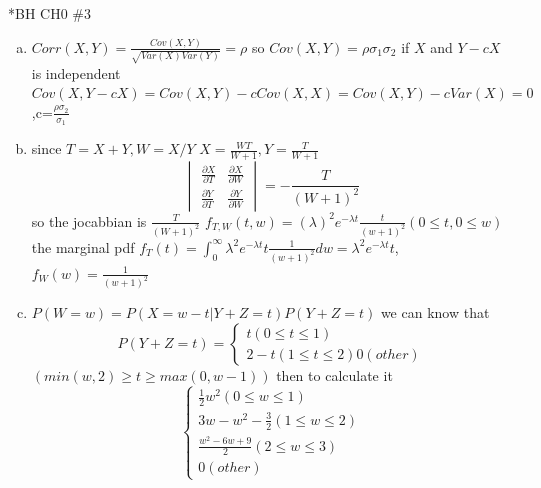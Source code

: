 \documentclass{article}
\begin{document}
\begin{homeworkProblem}*{BH CH0 \#3}
	\begin{enumerate}[(a)]
	\item $Corr(X,Y)=\frac{Cov(X,Y)}{\sqrt{Var(X)Var(Y)}}=\rho$ so $Cov(X,Y)=\rho \sigma_1\sigma_2$ if $X$ and $Y-cX$ is independent $Cov(X,Y-cX)=Cov(X,Y)-cCov(X,X)=Cov(X,Y)-cVar(X)=0$,c=$\frac{\rho\sigma_2}{\sigma_1}$
		\item since $T=X+Y,W=X/Y$ $X=\frac{WT}{W+1},Y=\frac{T}{W+1}$
		\begin{equation}
		\begin{vmatrix}
		\frac{\partial X}{\partial T} & \frac{\partial X}{\partial W} \\
		\frac{\partial Y}{\partial T} &\frac{\partial Y}{\partial W}
		\end{vmatrix}=-\frac{T}{(W+1)^2}
	\end{equation}
	so the jocabbian is $\frac{T}{(W+1)^2}$ $f_{T,W}(t,w)=(\lambda)^2 e^{-\lambda t} \frac{t}{(w+1)^2}(0\leq t,0\leq w) $ the marginal pdf $f_T(t)=\int _{0}^{\infty}\lambda^{2}e^{-\lambda t}t \frac{1}{(w+1)^2}dw=\lambda ^{2}e^{-\lambda t}t$,$f_{W}(w)=\frac{1}{(w+1)^2}$
	\item $P(W=w)=P(X=w-t|Y+Z=t)P(Y+Z=t)$ we can know that \begin{equation}	
		P(Y+Z=t)=\begin{cases}
			t(0\leq t \leq 1)\\
			2-t(1\leq t\leq 2)
			0 (other)
		\end{cases}
	\end{equation}
	$(min(w,2)\geq t\geq max(0,w-1))$ 
	then to calculate it \begin{equation}
		\begin{cases}
			\frac{1}{2}w^2 (0\leq w\leq 1)\\
			3w-w^{2}-\frac{3}{2}(1\leq w \leq 2)\\
			\frac{w^2-6w+9}{2}(2\leq w\leq 3)\\
		0(other)	
	\end{cases}
	\end{equation}	
\end{enumerate}
\end{homeworkProblem}
\end{document}
